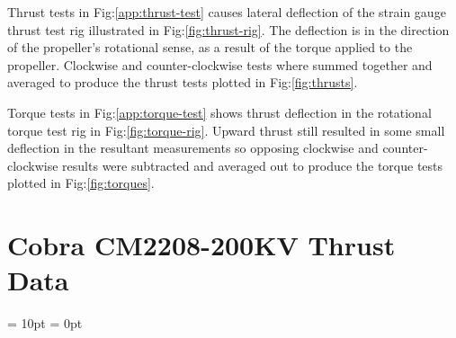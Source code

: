 Thrust tests in Fig:\ref{app:thrust-test} causes lateral deflection of the strain gauge thrust test rig illustrated in Fig:\ref{fig:thrust-rig}. The deflection is in the direction of the propeller's rotational sense, as a result of the torque applied to the propeller. Clockwise and counter-clockwise tests where summed together and averaged to produce the thrust tests plotted in Fig:\ref{fig:thrusts}.
\par
Torque tests in Fig:\ref{app:torque-test} shows thrust deflection in the rotational torque test rig in Fig:\ref{fig:torque-rig}. Upward thrust still resulted in some small deflection in the resultant measurements so opposing clockwise and counter-clockwise results were subtracted and averaged out to produce the torque tests plotted in Fig:\ref{fig:torques}.
\newpage
\section{Cobra CM2208-200KV Thrust Data}
\label{app:cobra-test}
\centering
{}
\restoregeometry
\newpage
\justifying
\parskip	= 10pt						%
\parindent 	= 0pt						%
